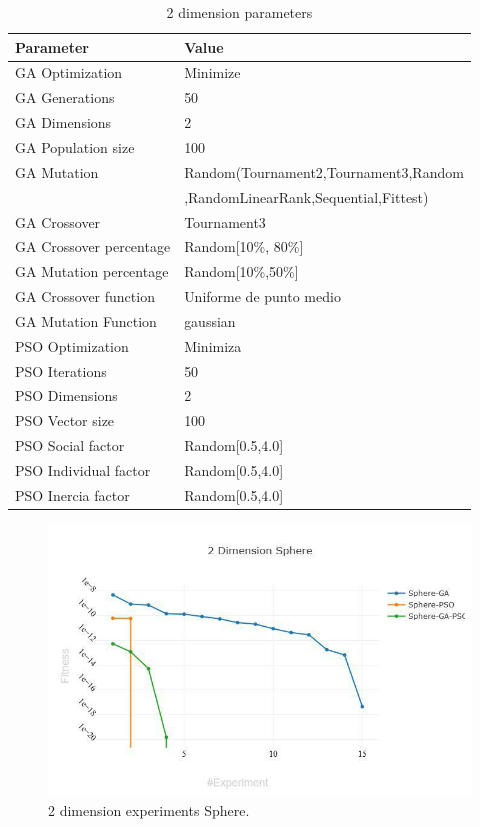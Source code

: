 \documentclass[runningheads]{llncs}
\begin{document}
   \begin{table}[htp]
    \caption{2 dimension parameters}
    \label{table:ga-pso-parameters-2}
    \centering
    \begin{tabular}{|l|l|}
    \hline
    Parameter & Value \\
    \hline
    \hline
    GA Optimization & Minimize \\
    \hline
    GA Generations & 50 \\
    \hline
    GA Dimensions & 2 \\
    \hline
    GA Population size & 100 \\
    \hline
    GA Mutation & Random(Tournament2,Tournament3,Random \\
    &  ,RandomLinearRank,Sequential,Fittest)\\
    \hline
    GA Crossover & Tournament3 \\
    \hline
    GA Crossover percentage & Random[10\%, 80\%] \\
    \hline
    GA Mutation percentage & Random[10\%,50\%] \\
    \hline
    GA Crossover function & Uniforme de punto medio \\
    \hline
    GA Mutation Function & gaussian \\
    \hline
    PSO Optimization & Minimiza \\
    \hline
    PSO Iterations & 50 \\
    \hline
    PSO Dimensions & 2 \\
    \hline
    PSO Vector size & 100 \\
    \hline
    PSO Social factor & Random[0.5,4.0] \\
    \hline
    PSO Individual factor & Random[0.5,4.0] \\
    \hline
    PSO Inercia factor & Random[0.5,4.0] \\
    \hline
    \end{tabular}
    \end{table}

\begin{figure}[htp]
\includegraphics[width=\textwidth]{2-sphere.jpg}
\caption{2 dimension experiments Sphere.} \label{fig1}
\end{figure}
\end{document}

